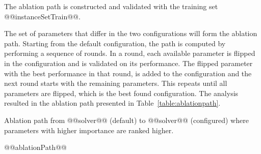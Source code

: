 \documentclass[british]{article}
\newif\iftest
\newif\ifablation
\begin{document}

\fi %

\ifablation
    \section{Parameter importance via Ablation}

    Ablation analysis~\cite{FawcettHoos16} is performed from the @@solver@@ (default) to @@solver@@ (configured) to see which parameter changes between them contribute most to the improved performance.
    \iftest
    The ablation path uses the training set @@instanceSetTrain@@ and validation is perform on the test set @@instanceSetTest@@.
    \else
    The ablation path is constructed and validated with the training set @@instanceSetTrain@@.
    \fi
    The set of parameters that differ in the two configurations will form the ablation path.
    Starting from the default configuration, the path is computed by performing a sequence of rounds.
    In a round, each available parameter is flipped in the configuration and is validated on its performance.
    The flipped parameter with the best performance in that round, is added to the configuration and the next round starts with the remaining parameters.
    This repeats until all parameters are flipped, which is the best found configuration.
    The analysis resulted in the ablation path presented in Table~\ref{table:ablationpath}.


    \begin{table}[htbp]
        \caption{Ablation path from @@solver@@ (default) to @@solver@@ (configured) where parameters with higher importance are ranked higher.}
        \label{table:ablationpath}
        \begin{center}
        \footnotesize
            @@ablationPath@@
        \end{center}
    \end{table}

\fi %



\end{document}
